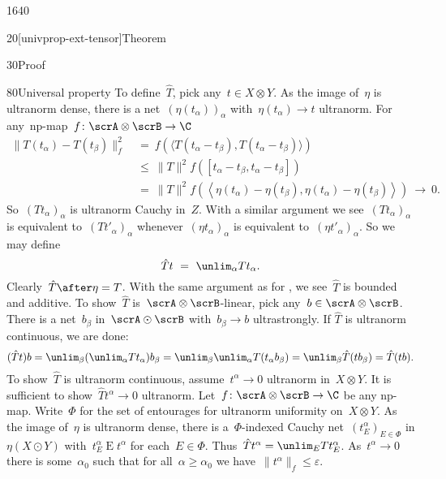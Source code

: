 \begin{parsec}{1640}
\begin{point}{20}[univprop-ext-tensor]{Theorem}
\begin{point}{30}{Proof}
\begin{point}{80}{Universal property}
To define~$\hat{T}$, pick any~$t \in X \otimes Y$.
As the image of~$\eta$ is ultranorm dense,
there is a net~$(\eta(t_\alpha))_\alpha$ with~$\eta(t_\alpha) \to t$ ultranorm.
For any~np-map~$f\colon \scrA\otimes \scrB \to \C$
\begin{align*}
    \|T(t_\alpha) - T(t_\beta) \|_f^2 
        &\ =\ f(\langle T(t_\alpha - t_\beta), T(t_\alpha - t_\beta) \rangle) \\
        & \ \leq \ \|T\|^2 f([t_\alpha-t_\beta, t_\alpha - t_\beta]) \\
        & \ = \ \|T\|^2 f(\left<\eta (t_\alpha)-\eta(t_\beta), \eta(t_\alpha) - \eta(t_\beta)\right>) \ \to\  0.
\end{align*}
So~$(T t_\alpha)_\alpha$ is ultranorm Cauchy in~$Z$.
With a similar argument we see~$(Tt_\alpha)_\alpha $
    is equivalent to~$ (T t'_\alpha)_\alpha$
whenever~$(\eta t_\alpha)_\alpha $ is equivalent
    to~$ (\eta t'_\alpha)_\alpha$.
So we may define
\begin{equation*}
\hat{T} t \ = \ \unlim_\alpha T t_\alpha.
\end{equation*}
Clearly~$\hat{T} \after \eta = T$.
With the same argument as for ,
    we see~$\hat{T}$ is bounded and additive.
To show~$\hat{T}$ is~$\scrA\otimes \scrB$-linear,
    pick any~$b \in \scrA \otimes \scrB$.
There is a net~$b_\beta$ in~$\scrA \odot \scrB$
    with~$b_\beta \to b$ ultrastrongly.
If $\hat{T}$ is ultranorm continuous, we are done:
\begin{equation*}
    (\hat{T} t) b
    = \unlim_\beta (\unlim_\alpha T t_\alpha) b_\beta\\
     = \unlim_\beta \unlim_\alpha T (t_\alpha b_\beta) \\
     = \unlim_\beta \hat{T} (t b_\beta)\\
     = \hat{T} (tb).
\end{equation*}
To show~$\hat{T}$ is ultranorm continuous,
    assume~$t^\alpha \to 0$ ultranorm in~$X \otimes Y$.
It is sufficient to show~$\hat{T} t^\alpha \to 0$ ultranorm.
Let~$f\colon \scrA\otimes \scrB \to \C$ be any np-map.
Write~$\Phi$ for the set of entourages for ultranorm uniformity
    on~$X \otimes Y$.
As the image of~$\eta$ is ultranorm dense,
there is a~$\Phi$-indexed Cauchy net~$(t^\alpha_E)_{E \in \Phi}$ in
    $\eta (X \odot Y)$
    with~$t^\alpha_E \mathrel{E} t^\alpha$
    for each~$E \in \Phi$.
Thus~$\hat{T} t^\alpha = \unlim_E T t^\alpha_E$.
As~$t^\alpha \to 0$
    there is some~$\alpha_0$
    such that for all~$\alpha \geq \alpha_0$
    we have~$\|t^\alpha \|_f \leq \varepsilon$.

\end{point}
\end{point}
\end{point}
\end{parsec}
